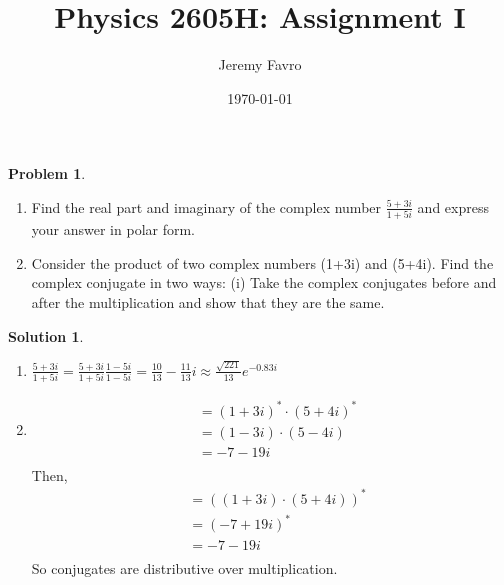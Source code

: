 \documentclass[10pt]{article}
\title{Physics 2605H: Assignment I}
\author{Jeremy Favro}
\date{\today}
\theoremstyle{definition}
\newtheorem{problem}{Problem}
\newtheorem{soln}{Solution}
\begin{document}
\maketitle

\begin{problem}~
\begin{enumerate}[label=(\alph*)]
  \item Find the real part and imaginary of the complex number $\frac{5+3i}{1+5i}$ and express your answer in polar form.
  \item Consider the product of two complex numbers (1+3i) and (5+4i). Find the complex conjugate in two ways:
        (i) Take the complex conjugates before and after the multiplication and show that they are the same.
\end{enumerate}
\end{problem}
\begin{soln}
  \begin{enumerate}[label=(\alph*)]
    \item $\frac{5+3i}{1+5i}=\frac{5+3i}{1+5i}\frac{1-5i}{1-5i}=\frac{10}{13}-\frac{11}{13}i\approx\frac{\sqrt{221}}{13}e^{-0.83i}$
    \item \begin{align*}
      & = (1+3i)^*\cdot(5+4i)^* \\
      & = (1-3i)\cdot(5-4i) \\
      & = -7-19i\\
    \end{align*}
    Then,
    \begin{align*}
      & = ((1+3i)\cdot(5+4i))^*\\
      & = (-7+19i)^* \\
      & = -7-19i\\
    \end{align*}
    So conjugates are distributive over multiplication.
  \end{enumerate}
\end{soln}
\end{document}
